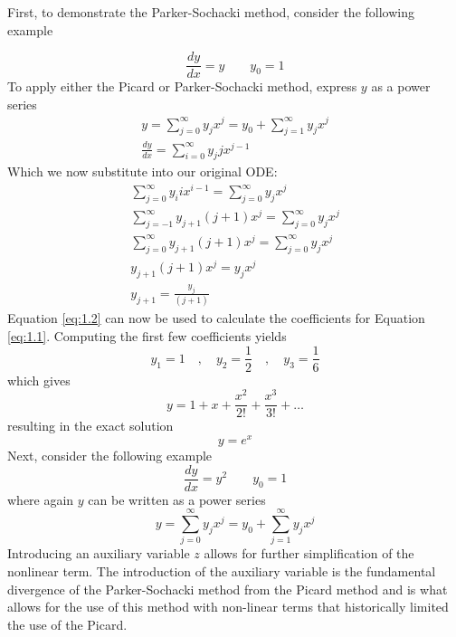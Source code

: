 \documentclass[9pt]{article}
\begin{document}
\begin{multicols}{2}
First, to demonstrate the Parker-Sochacki method, consider the following example

    \begin{equation}
        \frac{dy}{dx}=y\quad\quad y_0=1
    \end{equation}
To apply either the Picard or Parker-Sochacki method, express $y$ as a power series
    \begin{gather}
            y=\sum_{j=0}^\infty y_jx^j=y_0+\sum_{j=1}^\infty y_{j}x^{j}\label{eq:1.1} \\    
            \frac{dy}{dx}=\sum_{i=0}^\infty y_jjx^{j-1}
    \end{gather}
Which we now substitute into our original ODE:
    \begin{gather}
            \sum_{j=0}^\infty y_iix^{i-1}=\sum_{j=0}^\infty y_jx^j\\
            \sum_{j=-1}^\infty y_{j+1}(j+1)x^{j}=\sum_{j=0}^\infty y_jx^j\\
            \sum_{j=0}^\infty y_{j+1}(j+1)x^{j}=\sum_{j=0}^\infty y_jx^j\\
            y_{j+1}(j+1)x^{j}=y_jx^j\\
            y_{j+1}=\frac{y_j}{(j+1)} \label{eq:1.2} 
    \end{gather}
Equation \ref{eq:1.2} can now be used to calculate the coefficients for Equation \ref{eq:1.1}. Computing the first few coefficients yields
    \begin{equation}
        y_1=1\quad,\quad y_2=\frac{1}{2}\quad,\quad y_3=\frac{1}{6}
    \end{equation}
which gives
    \begin{equation}
        y=1+x+\frac{x^2}{2!}+\frac{x^3}{3!}+\dots
    \end{equation}
resulting in the exact solution
    \begin{equation}
        y=e^x
    \end{equation}
Next, consider the following example
        \begin{equation}\label{eq:1.6} 
        \frac{dy}{dx}=y^2\quad\quad y_0=1
    \end{equation}
where again $y$ can be written as a power series
    \begin{equation}
        y=\sum_{j=0}^\infty y_jx^j=y_0+\sum_{j=1}^\infty y_{j}x^{j}\label{eq:1.3}    
    \end{equation}
Introducing an auxiliary variable $z$ allows for further simplification of the nonlinear term. The introduction of the auxiliary variable is the fundamental divergence of the Parker-Sochacki method from the Picard method and is what allows for the use of this method with non-linear terms that historically limited the use of the Picard. 

\end{multicols}
\end{document}
